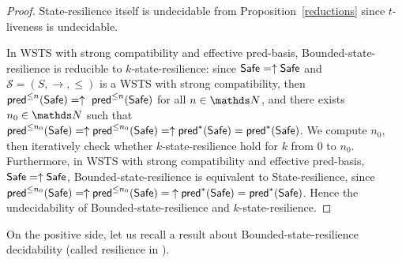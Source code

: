 \begin{proof}
{\sc State-resilience} itself is undecidable from Proposition~\ref{reductions} since 
{\sc %
$t$-liveness} is undecidable.


In WSTS with strong compatibility and effective pred-basis, {\sc Bounded-state-resilience} is
reducible to {\sc $k$-state-resilience}:
% 
since $\Safe=\uparrow \Safe$ and
$\mathscr{S}=(S,\rightarrow,\leq)$ is a WSTS with strong %
compatibility, then $\textsf{pred}^{\leq n}(\textsf{Safe})= \uparrow~\textsf{pred}^{\leq n}(\textsf{Safe})$ for all $n \in \N$,
and there exists $n_0 \in \N$ such that 
$\textsf{pred}^{\leq n_0}(\textsf{Safe}) = \uparrow \textsf{pred}^{\leq n_0}(\textsf{Safe}) = \uparrow \textsf{pred}^*(\textsf{Safe}) = \textsf{pred}^*(\textsf{Safe})$.
We compute 
$n_0$, then iteratively check whether $k$-state-resilience 
hold for $k$ from $0$ to $n_0$.  
Furthermore, in WSTS with strong compatibility and effective pred-basis,  $\Safe=\uparrow \Safe$, {\sc Bounded-state-resilience} is equivalent to {\sc State-resilience},
%
since 
$\textsf{pred}^{\leq n_0}(\textsf{Safe}) = \uparrow \textsf{pred}^{\leq n_0}(\textsf{Safe}) = {\uparrow \textsf{pred}^*(\textsf{Safe})} = \textsf{pred}^*(\textsf{Safe})$.
Hence the %
 undecidability of {\sc Bounded-state-resilience}
and 
 {\sc $k$-state-resilience}.
%
%
\iffalse
Bounded-state-resilience and 
$k$ state-resilience are undecidable for strongly compatible WSTS with effective pred-basis
when
$\Safe=\uparrow \Safe$
and $\Bad=\downarrow \Bad$.
\fi
%
\end{proof}






On the positive side, let us recall a result about {\sc Bounded-state-resilience} decidability (called resilience in \cite{DBLP:conf/gg/Ozkan22,DBLP:journals/corr/abs-2108-00889}).

